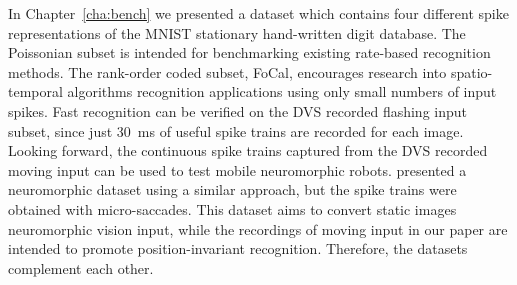%
In Chapter~\ref{cha:bench} we presented a dataset which contains four different spike representations of the MNIST stationary hand-written digit database. %
The Poissonian subset is intended for benchmarking existing rate-based recognition methods.
The rank-order coded subset, FoCal, encourages research into spatio-temporal algorithms \DIFdelbegin {}\DIFdelend \DIFaddbegin {}\DIFaddend recognition applications using only small numbers of input spikes.
Fast recognition can be verified on the DVS recorded flashing input subset, since just 30~ms of useful spike trains are recorded for each image.
Looking forward, the continuous spike trains captured from the DVS recorded moving input can be used to test mobile neuromorphic robots.
\DIFdelbegin {}\DIFdelend \DIFaddbegin {}\DIFaddend presented a neuromorphic dataset using a similar approach, but the spike trains were obtained with micro-saccades.
This dataset aims to convert static images \DIFdelbegin {}\DIFdelend \DIFaddbegin {}\DIFaddend neuromorphic vision input, while the recordings of moving input in our paper are intended to promote position-invariant recognition.
Therefore, the datasets complement each other.

